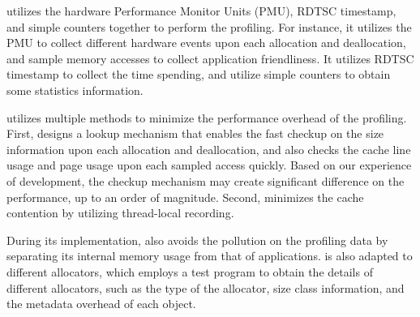 \MP{} utilizes the hardware Performance Monitor Units (PMU), RDTSC timestamp, and simple counters together to perform the profiling. For instance, it utilizes the PMU to collect different hardware events upon each allocation and deallocation, and sample memory accesses to collect application friendliness. It utilizes RDTSC timestamp to collect the time spending, and utilize simple counters to obtain some statistics information.  

 
\MP{} utilizes multiple methods to minimize the performance overhead of the profiling. First, \MP{} designs a lookup mechanism that enables the fast checkup on the size information upon each allocation and deallocation, and also checks the cache line usage and page usage upon each sampled access quickly. Based on our experience of development, the checkup mechanism may  create significant difference on the performance, up to an order of magnitude. Second, \MP{} minimizes the cache contention by utilizing thread-local recording.  


During its implementation, \MP{} also avoids the pollution on the profiling data by separating its internal memory usage from that of applications. \MP{} is also adapted to different allocators, which employs a  test program to obtain the details of different allocators, such as the type of the allocator, size class information, and the metadata overhead of each object. 


\begin{comment}

1. Maybe we should detect the contention rate. If the last write is from a different thread, we will detect one contention. 
 
allocator: can we use some different configurations of the same allocator?
Can we use the same allocator on different applications, achieving different allocators?  
}





performance overhead: 
1. Using the hash maps to identify the size of each object is very slow. 
2. Turning multiple reads into one read around 2 or three times. 
3. Using the new mapping mechanism. 

How we can do that for glibc. We migrate the glibc as separate library, allowing us to intercept system or libraries. 

How to figure out the metadata information?
	
\end{comment}

 

